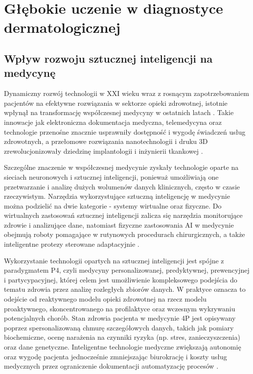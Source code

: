 
\def\filename{rozdzial2}

\chapter{Głębokie uczenie w diagnostyce dermatologicznej}

\section{Wpływ rozwoju sztucznej inteligencji na medycynę}
Dynamiczny rozwój technologii w XXI wieku wraz z rosnącym zapotrzebowaniem pacjentów na efektywne rozwiązania w sektorze opieki zdrowotnej, istotnie wpłynął na transformację współczesnej medycyny w ostatnich latach \cite{CHAPMAN20153}.
Takie innowacje jak elektroniczna dokumentacja medyczna, telemedycyna oraz technologie przenośne znacznie usprawniły dostępność i wygodę świadczeń usług zdrowotnych, a przełomowe rozwiązania nanotechnologii i druku 3D zrewolucjonizowały dziedzinę implantologii i inżynierii tkankowej \cite{HALEEM202370, mahara_revolutionising_2023, thacharodi_revolutionizing_2024}.

Szczególne znaczenie w współczesnej medycynie zyskały technologie oparte na sieciach neuronowych i sztucznej inteligencji, ponieważ umożliwiają one przetwarzanie i analizę dużych wolumenów danych klinicznych, często w czasie rzeczywistym.
Narzędzia wykorzystujące sztuczną inteligencję w medycynie można podzielić na dwie kategorie - systemy wirtualne oraz fizyczne.
Do wirtualnych zastosowań sztucznej inteligencji zalicza się narzędzia monitorujące zdrowie i analizujące dane, natomiast fizyczne zastosowania AI w medycynie obejmują roboty pomagające w rutynowych procedurach chirurgicznych, a także inteligentne protezy sterowane adaptacyjnie \cite{amisha_overview_2019, sezer_application_2020}.

Wykorzystanie technologii opartych na sztucznej inteligencji jest spójne z paradygmatem P4, czyli medycyny personalizowanej, predyktywnej, prewencyjnej i partycypacyjnej, której celem jest umożliwienie kompleksowego podejścia do tematu zdrowia przez analizę rozległych zbiorów danych.
W praktyce oznacza to odejście od reaktywnego modelu opieki zdrowotnej na rzecz modelu proaktywnego, skoncentrowanego na profilaktyce oraz wczesnym wykrywaniu potencjalnych chorób.
Stan zdrowia pacjenta w medycynie 4P jest opisywany poprzez spersonalizowaną chmurę szczegółowych danych, takich jak pomiary biochemiczne, ocenę narażenia na czynniki ryzyka (np. stres, zanieczyszczenia) oraz dane genetyczne.
Inteligentne technologie medyczne zwiększają autonomię oraz wygodę pacjenta jednocześnie zmniejszając biurokrację i koszty usług medycznych przez ograniczenie dokumentacji automatyzację procesów \cite{glos_medycyna_2017, alonso_predictive_2019, briganti_artificial_2020}.

